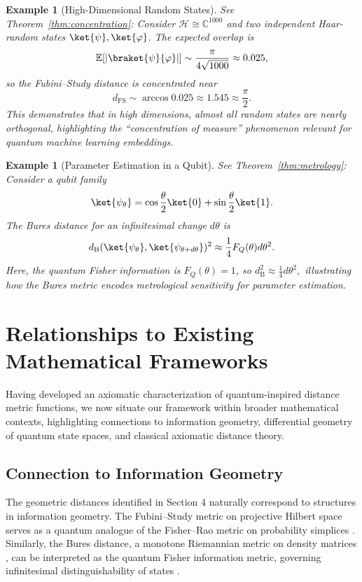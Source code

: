 \documentclass[aps,pra,reprint,nofootinbib,showpacs,superscriptaddress]{revtex4-1}
\newtheorem{example}[theorem]{Example}
\newcommand{\Hilbert}{\mathcal{H}}
\begin{document}
\begin{example}[High-Dimensional Random States]
See Theorem~\ref{thm:concentration}:
Consider $\Hilbert \cong \mathbb{C}^{1000}$ and two independent Haar-random states $\ket{\psi}, \ket{\varphi}$. The expected overlap is
\[
\mathbb{E}[|\braket{\psi}{\varphi}|] \sim \frac{\pi}{4\sqrt{1000}} \approx 0.025,
\]
so the Fubini--Study distance is concentrated near
\[
d_{\text{FS}} \sim \arccos 0.025 \approx 1.545 \approx \frac{\pi}{2}.
\]
This demonstrates that in high dimensions, almost all random states are nearly orthogonal, highlighting the “concentration of measure” phenomenon relevant for quantum machine learning embeddings.
\end{example}
\begin{example}[Parameter Estimation in a Qubit]
See Theorem~\ref{thm:metrology}:
Consider a qubit family
\[
\ket{\psi_\theta} = \cos\frac{\theta}{2}\ket{0} + \sin\frac{\theta}{2}\ket{1}.
\]
The Bures distance for an infinitesimal change $d\theta$ is
\[
d_{\text{B}}(\ket{\psi_\theta}, \ket{\psi_{\theta + d\theta}})^2 \approx \frac{1}{4} F_Q(\theta) d\theta^2.
\]
Here, the quantum Fisher information is $F_Q(\theta) = 1$, so
\(
d_{\text{B}}^2 \approx \frac{1}{4} d\theta^2,
\)
illustrating how the Bures metric encodes metrological sensitivity for parameter estimation.
\end{example}
\section{Relationships to Existing Mathematical Frameworks}\label{sec:rel}
Having developed an axiomatic characterization of quantum-inspired distance metric functions, we now situate our framework within broader mathematical contexts, highlighting connections to information geometry, differential geometry of quantum state spaces, and classical axiomatic distance theory.
\subsection{Connection to Information Geometry}
The geometric distances identified in Section 4 naturally correspond to structures in information geometry. The Fubini--Study metric on projective Hilbert space serves as a quantum analogue of the Fisher--Rao metric on probability simplices \cite{amari2000methods}. Similarly, the Bures distance, a monotone Riemannian metric on density matrices \cite{uhlmann1976transition}, can be interpreted as the quantum Fisher information metric, governing infinitesimal distinguishability of states \cite{braunstein1994statistical}.
\end{document}
